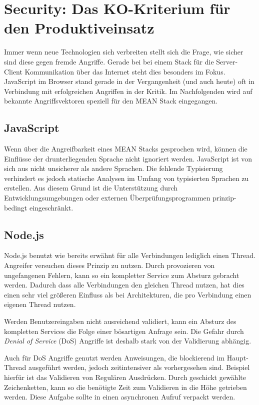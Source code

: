 \chapter{Security: Das KO-Kriterium für den Produktiveinsatz}\label{security-das-ko-kriterium-fuxfcr-den-produktiveinsatz-marinus}

Immer wenn neue Technologien sich verbreiten stellt sich die Frage, wie
sicher sind diese gegen fremde Angriffe. Gerade bei bei einem Stack für
die Server-Client Kommunikation über das Internet steht dies besonders
im Fokus. JavaScript im Browser stand gerade in der Vergangenheit (und
auch heute) oft in Verbindung mit erfolgreichen Angriffen in der Kritik.
Im Nachfolgenden wird auf bekannte Angriffsvektoren speziell für den
MEAN Stack eingegangen.

\section{JavaScript}\label{javascript}

Wenn über die Angreifbarkeit eines MEAN Stacks gesprochen wird, können
die Einflüsse der drunterliegenden Sprache nicht ignoriert werden.
JavaScript ist von sich aus nicht unsicherer als andere Sprachen. Die
fehlende Typisierung verhindert es jedoch statische Analysen im Umfang
von typisierten Sprachen zu erstellen. Aus diesem Grund ist die
Unterstützung durch Entwicklungsumgebungen oder externen
Überprüfungsprogrammen prinzip-bedingt eingeschränkt.

\section{Node.js}\label{node.js}

Node.js benutzt wie bereits erwähnt für alle Verbindungen lediglich
einen Thread. Angreifer versuchen dieses Prinzip zu nutzen. Durch
provozieren von ungefangenen Fehlern, kann so ein kompletter Service zum
Absturz gebracht werden. Dadurch dass alle Verbindungen den gleichen
Thread nutzen, hat dies einen sehr viel größeren Einfluss als bei
Architekturen, die pro Verbindung einen eigenen Thread nutzen.

Werden Benutzereingaben nicht ausreichend validiert, kann ein Absturz
des kompletten Services die Folge einer bösartigen Anfrage sein. Die
Gefahr durch \emph{Denial of Service} (DoS) Angriffe ist deshalb stark von
der Validierung abhängig.

Auch für DoS Angriffe genutzt werden Anweisungen, die blockierend im
Haupt-Thread ausgeführt werden, jedoch zeitintensiver als vorhergesehen
sind. Beispiel hierfür ist das Validieren von Regulären Ausdrücken.
Durch geschickt gewählte Zeichenketten, kann so die benötigte Zeit zum
Validieren in die Höhe getrieben werden. Diese Aufgabe sollte in einen
asynchronen Aufruf verpackt werden.

